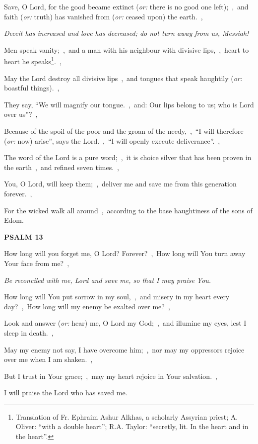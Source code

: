 \documentclass[12pt,twoside,a5paper]{article}
\newcommand{\psalm}[1]{\textbf{PSALM {#1}}}
\newcommand{\qanona}[1]{{\liturgicalhint{Qanona.} \emph{#1}}}
\newcommand{\translationoption}[1]{\emph{or:} #1}
\begin{document}
\begin{normalparskip}
  Save, O Lord, for the good became extinct (\translationoption{there is no good one left});~\sep\ and faith (\translationoption{truth}) has vanished from (\translationoption{ceased upon}) the earth.~\sep

  \qanona{Deceit has increased and love has decreased; do not turn away from us, Messiah!}

  Men speak vanity;~\sep\ and a man with his neighbour with divisive lips,~\sep\ heart to heart he speaks\footnote{Translation of Fr. Ephraim Ashur Alkhas, a scholarly Assyrian priest; A. Oliver: ``with a double heart''; R.A. Taylor: ``secretly, lit. In the heart and in the heart''.}.~\sep

  May the Lord destroy all divisive lips~\sep\ and tongues that speak haughtily (\translationoption{boastful things}).~\sep

  They say, ``We will magnify our tongue.~\sep\ and: Our lips belong to us; who is Lord over us''?~\sep

  Because of the spoil of the poor and the groan of the needy,~\sep\ ``I will therefore (\translationoption{now}) arise'', says the Lord.~\sep\ ``I will openly execute deliverance''.~\sep

  The word of the Lord is a pure word;~\sep\ it is choice silver that has been proven in the earth~\sep\ and refined seven times.~\sep

  You, O Lord, will keep them;~\sep\ deliver me and save me from this generation forever.~\sep

  For the wicked walk all around~\sep\ according to the base haughtiness of the sons of Edom.
\end{normalparskip}

\psalm{13}

\begin{normalparskip}
  How long will you forget me, O Lord? Forever?~\sep\ How long will You turn away Your face from me?~\sep

  \qanona{Be reconciled with me, Lord and save me, so that I may praise You.}

  How long will You put sorrow in my soul,~\sep\ and misery in my heart every day?~\sep\ How long will my enemy be exalted over me?~\sep

  Look and answer (\translationoption{hear}) me, O Lord my God;~\sep\ and illumine my eyes, lest I sleep in death.~\sep

  May my enemy not say, I have overcome him;~\sep\ nor may my oppressors rejoice over me when I am shaken.~\sep

  But I trust in Your grace;~\sep\ may my heart rejoice in Your salvation.~\sep

  I will praise the Lord who has saved me.
\end{normalparskip}
\end{document}
